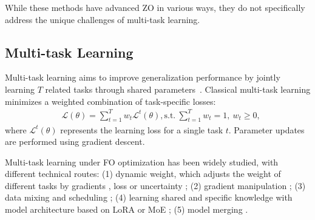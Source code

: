 While these methods have advanced ZO in various ways, they do not specifically address the unique challenges of multi-task learning.

\subsection{Multi-task Learning}
\label{sec:mtlfozo}
Multi-task learning aims to improve generalization performance by jointly learning $T$ related tasks through shared parameters~\citep{10.1145/3663363}. Classical multi-task learning minimizes a weighted combination of task-specific losses:
\vspace{-5pt} 
\begin{align}
\label{eq:mtl_objective}
    & \mathcal{L}(\theta) = \sum_{t=1}^T w_t \mathcal{L}^t(\theta), \text{s.t.}\ \sum_{t=1}^T w_t = 1,\ w_t \geq 0,
\end{align}
\vskip -11pt 
\noindent where $\mathcal{L}^t(\theta)$ represents the learning loss for a single task $t$. Parameter updates are performed using gradient descent. 

Multi-task learning under FO optimization has been widely studied, with different technical routes: (1) dynamic weight, which adjusts the weight of different tasks by gradients \citep{chen2018gradnorm,sener2018multi,mao-etal-2022-metaweighting}, loss \citep{liu2019loss,liu2024famo,kongyoung-etal-2020-multi,gong2024coba} or uncertainty \citep{AGHAJANZADEH2023109587}; (2) gradient manipulation \citep{desideri2012multiple,liu2021conflict,yu2020gradient}; (3) data mixing and scheduling \citep{bai2024survey,ahmadian2024mix}; (4) learning shared and specific knowledge with model architecture based on LoRA \citep{feng2024mixture,yang2024mtl,wang2023multilora} or MoE \citep{liu2023moelora,gupta2022sparsely}; (5) model merging \citep{yang2023adamerging}.





